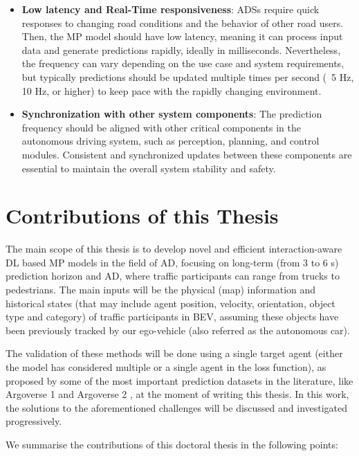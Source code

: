 \begin{itemize}
	\item \textbf{Low latency and Real-Time responsiveness}: \acp{ADS} require quick responses to changing road conditions and the behavior of other road users. Then, the \ac{MP} model should have low latency, meaning it can process input data and generate predictions rapidly, ideally in milliseconds. Nevertheless, the frequency can vary depending on the use case and system requirements, but typically predictions should be updated multiple times per second (\eg \ 5 Hz, 10 Hz, or higher) to keep pace with the rapidly changing environment.

	\item \textbf{Synchronization with other system components}: The prediction frequency should be aligned with other critical components in the autonomous driving system, such as perception, planning, and control modules. Consistent and synchronized updates between these components are essential to maintain the overall system stability and safety.
	
\end{itemize}

\section{Contributions of this Thesis}
\label{sec:1_objectives_and_contributions}

The main scope of this thesis is to develop novel and efficient interaction-aware \ac{DL} based \ac{MP} models in the field of \ac{AD}, focusing on long-term (from 3 to 6 s) prediction horizon and \ac{AD}, where traffic participants can range from trucks to pedestrians. The main inputs will be the physical (map) information and historical states (that may include agent position, velocity, orientation, object type and category) of traffic participants in \ac{BEV}, assuming these objects have been previously tracked by our ego-vehicle (also referred as the autonomous car). 

The validation of these methods will be done using a single target agent (either the model has considered multiple or a single agent in the loss function), as proposed by some of the most important prediction datasets in the literature, like Argoverse 1 \cite{chang2019argoverse} and Argoverse 2 \cite{wilson2023argoverse}, at the moment of writing this thesis. In this work, the solutions to the aforementioned challenges will be discussed and investigated progressively. 

We summarise the contributions of this doctoral thesis in the following points:

